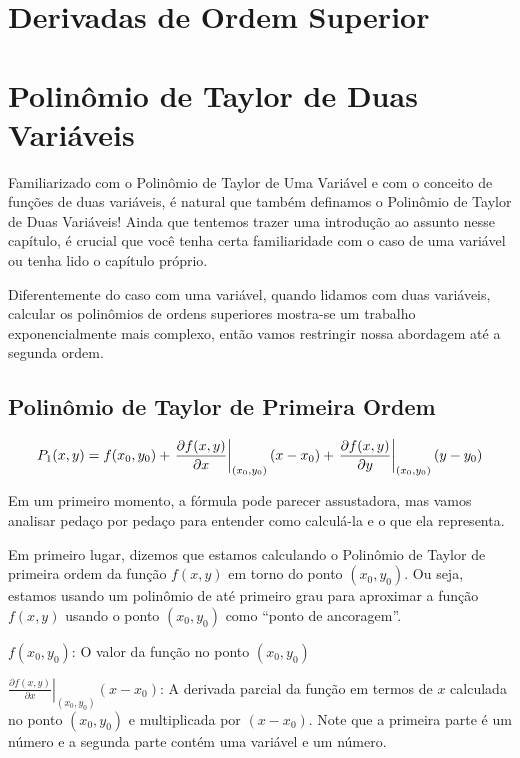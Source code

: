 \documentclass[
  portuguese,
  letterpaper,
  DIV=11,
  numbers=noendperiod]{scrreport}
\begin{document}
\chapter{Derivadas de Ordem Superior}\label{derivadas-de-ordem-superior}

\chapter{Polinômio de Taylor de Duas
Variáveis}\label{polinuxf4mio-de-taylor-de-duas-variuxe1veis}

Familiarizado com o Polinômio de Taylor de Uma Variável e com o conceito
de funções de duas variáveis, é natural que também definamos o Polinômio
de Taylor de Duas Variáveis! Ainda que tentemos trazer uma introdução ao
assunto nesse capítulo, é crucial que você tenha certa familiaridade com
o caso de uma variável ou tenha lido o capítulo próprio.

Diferentemente do caso com uma variável, quando lidamos com duas
variáveis, calcular os polinômios de ordens superiores mostra-se um
trabalho exponencialmente mais complexo, então vamos restringir nossa
abordagem até a segunda ordem.

\section{Polinômio de Taylor de Primeira
Ordem}\label{polinuxf4mio-de-taylor-de-primeira-ordem}

\[
P_1(x,y) = f(x_0, y_0) + 
\left. \frac{\partial f(x,y)}{\partial x} \right |_{(x_0,y_0)} (x-x_0) +
\left. \frac{\partial f(x,y)}{\partial y} \right |_{(x_0,y_0)} (y-y_0) \\
\]

Em um primeiro momento, a fórmula pode parecer assustadora, mas vamos
analisar pedaço por pedaço para entender como calculá-la e o que ela
representa.

Em primeiro lugar, dizemos que estamos calculando o Polinômio de Taylor
de primeira ordem da função \(f(x,y)\) em torno do ponto \((x_0,y_0)\).
Ou seja, estamos usando um polinômio de até primeiro grau para aproximar
a função \(f(x,y)\) usando o ponto \((x_0,y_0)\) como ``ponto de
ancoragem''.

\(f(x_0,y_0)\): O valor da função no ponto \((x_0, y_0)\)

\(\left. \frac{\partial f(x,y)}{\partial x} \right |_{(x_0,y_0)} (x-x_0)\):
A derivada parcial da função em termos de \(x\) calculada no ponto
\((x_0, y_0)\) e multiplicada por \((x-x_0)\). Note que a primeira parte
é um número e a segunda parte contém uma variável e um número.
\end{document}
